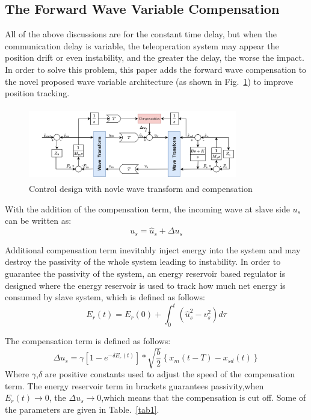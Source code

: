 \subsection{The Forward Wave Variable Compensation}
All of the above discussions are for the constant time delay,
but when the communication delay is variable,
the teleoperation system may appear the position drift or even instability,
and the greater the delay, the worse the impact. In order to solve this problem,
this paper adds the forward wave compensation to
the novel proposed wave variable architecture (as shown in Fig.~\ref{fig6})
to improve position tracking\cite{b16}.
\begin{figure}[htbp]
    \centerline{\includegraphics[height=3.2cm,width=9.1cm]{with compensation.jpg}}
    \caption{Control design with novle wave transform and compensation}
    \label{fig6}
\end{figure}
\par With the addition of the compensation term,
the incoming wave at slave side $u_s$ can be written as:
\begin{equation}
    {{u}_{s}}={{\hat{u}}_{s}}+\Delta {{u}_{s}}\label{eq18}
\end{equation}
\par Additional compensation term inevitably inject energy into the system
and may destroy the passivity of the whole system leading to instability.
In order to guarantee the passivity of the system,
an energy reservoir based regulator is designed
where the energy reservoir is used to track how much net energy is consumed by slave system,
which is defined as follows:
\begin{equation}
    {{E}_{r}}(t)={{E}_{r}}(0)+\int_{0}^{t}{(\hat{u}_{s}^{2}-v_{s}^{2})}d\tau\label{eq19}
\end{equation}
\par The compensation term is defined as follows:
\begin{equation}
    \Delta {{u}_{s}}=\gamma \left[ 1-{{e}^{-\delta {{E}_{r}}(t)}}
    \right]*\sqrt{\frac{b}{2}}\left\{ {{x}_{m}}(t-T)-{{x}_{sd}}(t) \right\}\label{eq20}
\end{equation}
Where $\gamma$,$\delta$ are positive constants used to adjust the speed of the compensation term.
The energy reservoir term in brackets guarantees passivity,when $E_r(t) \rightarrow 0$,
the $\Delta u_s \rightarrow 0$,which means that the compensation is cut off.
Some of the parameters are given in Table.~\ref{tab1}.

